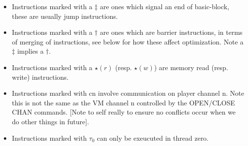 \begin{itemize}
\item Instructions marked with a $\ddagger$ are ones which signal an end of basic-block,
these are usually jump instructions.
\item Instructions marked with a $\dagger$ are ones which are barrier instructions, in
terms of merging of instructions, see below for how these affect optimization.
Note a $\ddagger$ implies a $\dagger$.
\item Instructions marked with a $\star(r)$ (resp. $\star(w)$) are memory read (resp. write) instructions.
\item Instructions marked with cn involve communication on player channel n. Note this is not the same
	as the VM channel n controlled by the OPEN/CLOSE CHAN commands. [Note to self really to ensure
	no conflicts occur when we do other things in future].
\item Instructions marked with $\tau_0$ can only be exeucuted in thread zero.
\end{itemize}
